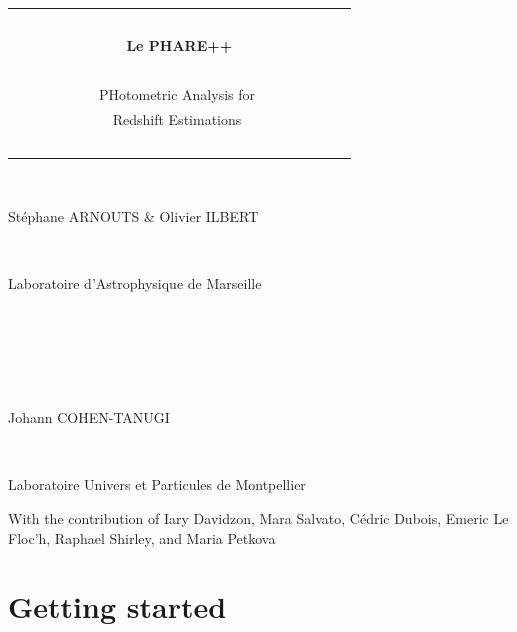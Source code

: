 \documentclass[12pt]{article}
\begin{document}


\newcommand{\lp}{\textit{LePHARE++} }
\newcommand{\zphot}{ $z_\mathrm{phot}$ }
\newcommand{\tbd}{ {\color{Cyan}[TBD]} } 
\newcommand{\comment}[1]{ {\color{Magenta}[#1]} }


\noindent  
\begin{table}[h]
\centering
\begin{tabular}{|c|}
\hline
\  \\
\Huge  {\bf Le PHARE++} \\
\  \\
\Large {\ \ \ \ \ \ \ \ \ \ \ \  PHotometric Analysis for \ \ \ \ \ \ \ \ \ \ \ \ }\\
\Large {\ \ \ \ \ \ \ \ \ \ \ \   Redshift Estimations    \ \ \ \ \ \ \ \ \ \ \ \ }\\
\  \\
\hline
\end{tabular}
\end{table}
\vspace*{0.5cm} \\
\large
\centerline{ St\'ephane ARNOUTS \& Olivier ILBERT} \\
\centerline{Laboratoire d'Astrophysique de Marseille}\\
\centerline{ \ \ } \\
\large
\centerline{Johann COHEN-TANUGI } \\
\centerline{Laboratoire Univers et Particules de Montpellier}
\vspace*{0.5cm} 
%
%
\begin{center}
With the contribution of Iary Davidzon, Mara Salvato, C\'edric Dubois, Emeric Le Floc'h, Raphael Shirley, and Maria Petkova
\end{center}
\vspace*{0.5cm} 
\normalsize
\tableofcontents
%
\newpage
%


\section{Getting started}\label{sect:starter}
%
%
%
\end{document}
